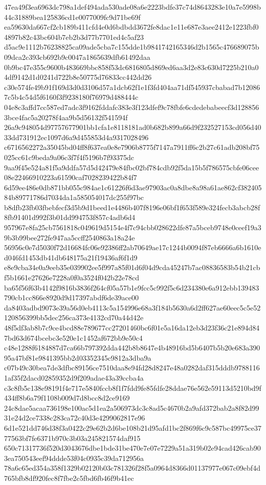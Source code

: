 \documentclass[11pt,a4paper]{article}
\begin{document}
{47ea49f3ea6963dc798a1def494ada530ade08a6e2223bdfe37c74d8643283e10a7e5998b44c31889bea125836cd1e0077009fc9d71be69f
ea59630da667cf2cb189b411cfd4e0d6bdbdd3672fe8dac1e11e687e3aee2412e1223fbf04897b82c43bc604b7eb2b3d77b7701ed4c5af23
d5ac9e1112b76238825ca09ade5cba7c155dde1b9841742165346d2b1565c476689075b09dca2c393cb692b9c0047a1865639dfb61492daa
0b9bc47e355c9600b483669bbc858f53dc6816805d869ed6aa3d2e83c630d7225b210a04df9142d1d0241d722b8e50775d76833cc442dd26
c30e574fe49b91f169d3d0d3106d57a1dcb62f1e1f3fd404aa71df545937cbabad7b120867c5b4c54d5f6160f3f9238180f76979d488444c
04e8c3affd7cc587ed7adc3f9162fddafc383e3f123dfef9c78fbfe6cdedebabeecf3d1288563bce4fac5a20278f4aa9b5d56132f541594f
26a9c948054d97757677901bb1cfa1e8118181ad0b682b899a66d9f232527153cd056d4033dd731912ec1097d6a9d455853d4a9317028496
c6716562272a35045bd04ff8f637ea0e8e7906b8775f7147a7911ff6c2b27c61adb208bf75025cc61c9beda9a06c3f7f4f5196b7f93375dc
9aa9f45e524a81f5a9ddfa57d5d42479e84fbc02bf784cdb92f5da15b5f786575cbfe06cee08e22466910223a61590caf7028239422b84f7
6d59ee486e0db871bb055c984ae1c61226f6d3ae97903ac0a8dbe8a98a61ae862cf38240584b89771786d7034da1a585054017dc255f97bc
b8dfb23fb03fbebfecf3d5b9d1beed1e4486b407f8196e06bf1f653f589e324fecb3abcb28f8fb91401d992f3b01dd994753f857c4adb6d4
957967e8fa25cb7561818c049619d5154e4f7c94cbb028622dfe87a5bceb9748e0ceef19a39b3b99bee272fe947aa5ccff2540863a18a24e
56956c0e7d5030f72d16684fc06e92386ff2ab70649ae17c1244b0094f87eb6666a6b1610ed046fd1453db41db648175a21f19436af6f1d9
e8e9cba34e0a9eeb35e039902ee5f997a85f01d6f04d9cda45247b7ac08836583b54b21cbf5b1661e27626e7228a0f0a3524f042b22e78cd
ba65f56f63b4142f9816b3836f264cf05a57b1e9fcc5c992f5c6d234380e6a912ebb139483790cb1cc866e8920d9d17397abdf6de39ace00
da8403adbd9073e39a56d0eb4113c5a154996e68a3f184b5630a6d2ff627ae60eec5c5e52120856399bb5dec256ca373e4132cd70a44d42e
48f5df3ab8b7c9ce4bcd88e789677cc27201460bc6f01e5a16da12eb3d23f36c21e894d847bd63d674bcebc3e520e1c1452af672bb9e50c4
c48e1288f6184887d7ca66b797392dda442b8b8647e4b48916bd5b6407b5b20e683a39095a47bf81e9841395bb2d03352345c9812a3dba9a
c07b49c30bea7de3dfbc89156ce7510daa8e94fd28d8247e48a0282daf315dddb97881161af35f2dacd02859352d9f209adae43a39ccba4a
c3c8fb5c138e98191f4e717e5840fccb8f1f7fdd9fe85fdfe28ddae76e562e59113d5210bd9f434ff8b6a79f1108b009d7d8bcc8d2ce9169
24c8dae5acaa736198e100ac5d1ea2a506973dc3c8ad5c4670b2a9afd372bab2a8f82d9931e24d2ce7338c283ca72c40d3e4299062817e96
6d1e521dd746d38f3a0422c29e62b2d6be108b21d95afd1bc2f869f6c9c587bc49975ce3777563bf7fe6371b970c3b03a245821574daf915
650c71317736f520d3043676dbe1bde31be470e7e07e7229a51a319b02e94cad426cab903ea750543eef94ddde53f04c0935c39da712956a
78a6c65ed354a358f1329b02120b03c781326f28f5a0964d8366d01137977e067c09ebf4d765bfb8df920fec8f7fbe2c5fbd6fb46f9b41ec
}
\end{document}
